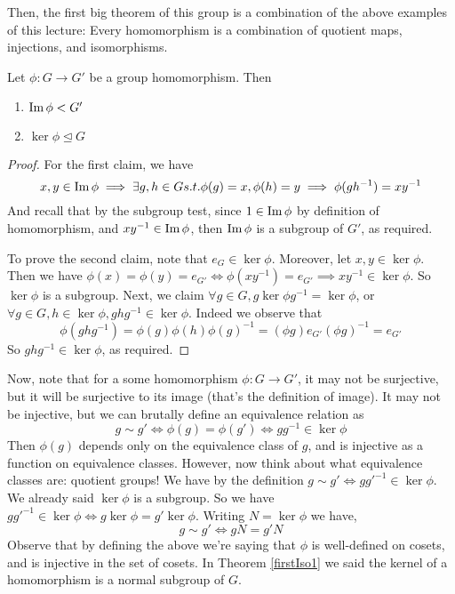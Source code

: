 Then, the first big theorem of this group is a combination of the above examples of this
lecture: Every homomorphism is a combination of quotient maps, injections, and
isomorphisms.
\begin{theorem} 
  Let $\phi:G\to G'$ be a group homomorphism. Then 
  \begin{enumerate}
    \item $\operatorname{Im}\phi < G'$
    \item $\ker\phi \trianglelefteq G$
  \end{enumerate}
  \label{firstIso1}
\end{theorem}
\begin{proof}
  For the first claim, we have
  \[x,y\in\operatorname{Im}\phi \implies \exists g,h\in G s.t. \phi(g)=x,\phi(h)=y \implies
  \phi(gh^{-1})=xy^{-1}\]
  And recall that by the subgroup test, since $1\in\operatorname{Im}\phi$ by definition of
  homomorphism, and $xy^{-1}\in\operatorname{Im}\phi$, then $\operatorname{Im}\phi$ is a subgroup of $G'$, as
  required.

  To prove the second claim, note that $e_G\in\ker\phi$. Moreover, let $x,y\in\ker\phi$.
  Then we have $\phi (x) = \phi (y) =e_{G'}\iff \phi (xy^{-1}) = e_{G'} \implies
  xy^{-1}\in\ker\phi$. So $\ker\phi$ is a subgroup. Next, we claim $\forall g\in G,
  g\ker\phi g^{-1}= \ker\phi$, or $\forall g\in G, h\in\ker\phi,ghg^{-1}\in\ker\phi$.
  Indeed we observe that 
  \[\phi(ghg^{-1})= \phi (g)\phi (h) \phi (g)^{-1} = (\phi g)e_{G'} (\phi g)^{-1} = e_{G'}\]
  So $ghg^{-1}\in\ker\phi$, as required.
\end{proof}

Now, note that for a some homomorphism $\phi:G\to G'$, it may not be surjective, but it
will be surjective to its image (that's the definition of image). It may not be injective,
but we can brutally define an equivalence relation as 
\[g\sim g' \iff \phi(g)=\phi(g')\iff gg^{-1}\in \ker\phi\]
Then $\phi(g)$ depends only on the equivalence class of $g$, and is injective as a
function on equivalence classes. However, now think about what equivalence classes are:
quotient groups! We have by the definition $g\sim g' \iff gg'^{-1}\in \ker\phi$. We already
said $\ker\phi$ is a subgroup. So we have $gg'^{-1}\in \ker\phi \iff
g\ker\phi=g'\ker\phi$. Writing $N=\ker\phi$ we have,
\[g\sim g' \iff gN = g'N\]
Observe that by defining the above we're saying that $\phi$ is well-defined on cosets, and
is injective in the set of cosets. In Theorem \ref{firstIso1} we said the kernel of a
homomorphism is a normal subgroup of $G$.

